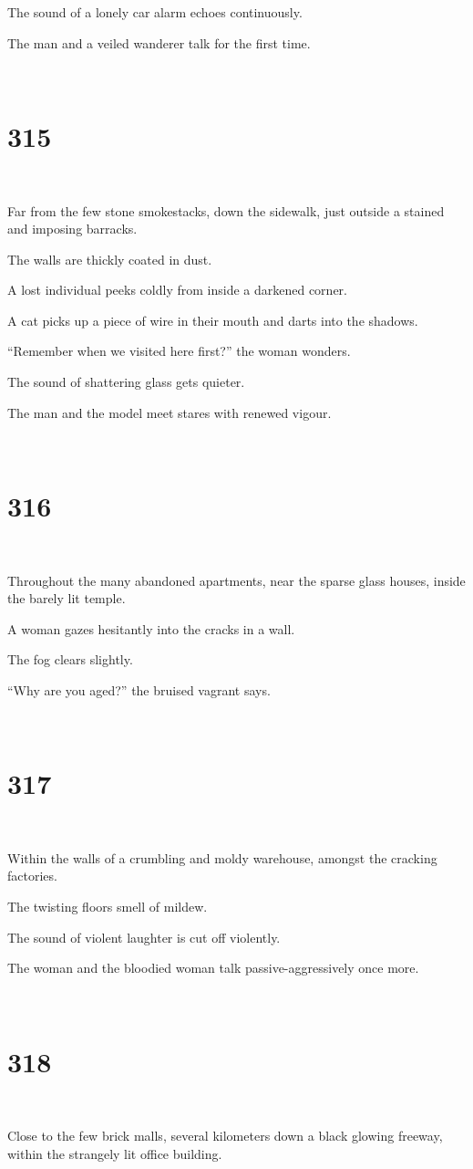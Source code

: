 \documentclass{report}
\begin{document}
The sound of a lonely car alarm echoes continuously.

The man and a veiled wanderer talk for the first time.

~
\chapter*{315}
~

Far from the few stone smokestacks, down the sidewalk, just outside a stained and imposing barracks.

The walls are thickly coated in dust.

A lost individual peeks coldly from inside a darkened corner.

A cat picks up a piece of wire in their mouth and darts into the shadows.

``Remember when we visited here first?'' the woman wonders.

The sound of shattering glass gets quieter.

The man and the model meet stares with renewed vigour.

~
\chapter*{316}
~

Throughout the many abandoned apartments, near the sparse glass houses, inside the barely lit temple.

A woman gazes hesitantly into the cracks in a wall.

The fog clears slightly.

``Why are you aged?'' the bruised vagrant says.

~
\chapter*{317}
~

Within the walls of a crumbling and moldy warehouse, amongst the cracking factories.

The twisting floors smell of mildew.

The sound of violent laughter is cut off violently.

The woman and the bloodied woman talk passive-aggressively once more.

~
\chapter*{318}
~

Close to the few brick malls, several kilometers down a black glowing freeway, within the strangely lit office building.
\end{document}
